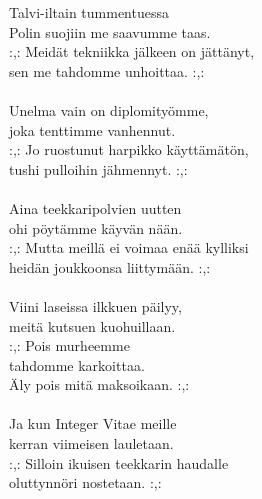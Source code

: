 
Talvi-iltain tummentuessa \\ Polin suojiin me saavumme taas. \\ :,: Meidät tekniikka jälkeen on jättänyt, \\ sen me tahdomme unhoittaa. :,: \\ \hspace{10mm} \\ Unelma vain on diplomityömme, \\ joka tenttimme vanhennut. \\ :,: Jo ruostunut harpikko käyttämätön, \\ tushi pulloihin jähmennyt. :,: \\ \hspace{10mm} \\ Aina teekkaripolvien uutten \\ ohi pöytämme käyvän nään. \\ :,: Mutta meillä ei voimaa enää kylliksi \\ heidän joukkoonsa liittymään. :,: \\ \hspace{10mm} \\ Viini laseissa ilkkuen päilyy, \\ meitä kutsuen kuohuillaan. \\ :,: Pois murheemme \\ tahdomme karkoittaa. \\ Äly pois mitä maksoikaan. :,: \\ \hspace{10mm} \\ Ja kun Integer Vitae meille \\ kerran viimeisen lauletaan. \\ :,: Silloin ikuisen teekkarin haudalle \\ oluttynnöri nostetaan. :,: